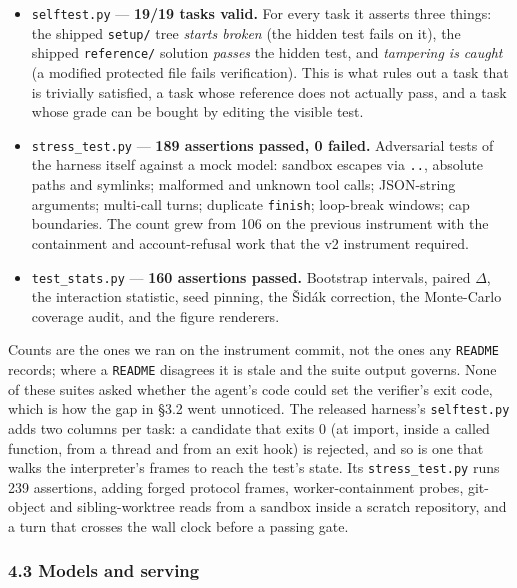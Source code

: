 \documentclass[
  10pt,
  a4paper,
]{article}
\providecommand{\tightlist}{%
  \setlength{\itemsep}{0pt}\setlength{\parskip}{0pt}}
\let\oldtexttt\texttt
\renewcommand{\texttt}[1]{{\small\oldtexttt{#1}}}
\begin{document}
\begin{itemize}
\tightlist
\item
  \texttt{selftest.py} --- \textbf{19/19 tasks valid.} For every task it
  asserts three things: the shipped \texttt{setup/} tree \emph{starts
  broken} (the hidden test fails on it), the shipped \texttt{reference/}
  solution \emph{passes} the hidden test, and \emph{tampering is caught}
  (a modified protected file fails verification). This is what rules out
  a task that is trivially satisfied, a task whose reference does not
  actually pass, and a task whose grade can be bought by editing the
  visible test.
\item
  \texttt{stress\_test.py} --- \textbf{189 assertions passed, 0 failed.}
  Adversarial tests of the harness itself against a mock model: sandbox
  escapes via \texttt{..}, absolute paths and symlinks; malformed and
  unknown tool calls; JSON-string arguments; multi-call turns; duplicate
  \texttt{finish}; loop-break windows; cap boundaries. The count grew
  from 106 on the previous instrument with the containment and
  account-refusal work that the v2 instrument required.
\item
  \texttt{test\_stats.py} --- \textbf{160 assertions passed.} Bootstrap
  intervals, paired \(\Delta\), the interaction statistic, seed pinning,
  the Šidák correction, the Monte-Carlo coverage audit, and the figure
  renderers.
\end{itemize}

Counts are the ones we ran on the instrument commit, not the ones any
\texttt{README} records; where a \texttt{README} disagrees it is stale
and the suite output governs. None of these suites asked whether the
agent's code could set the verifier's exit code, which is how the gap in
§3.2 went unnoticed. The released harness's \texttt{selftest.py} adds
two columns per task: a candidate that exits 0 (at import, inside a
called function, from a thread and from an exit hook) is rejected, and
so is one that walks the interpreter's frames to reach the test's state.
Its \texttt{stress\_test.py} runs 239 assertions, adding forged protocol
frames, worker-containment probes, git-object and sibling-worktree reads
from a sandbox inside a scratch repository, and a turn that crosses the
wall clock before a passing gate.

\subsubsection{4.3 Models and serving}\label{models-and-serving}
\end{document}

